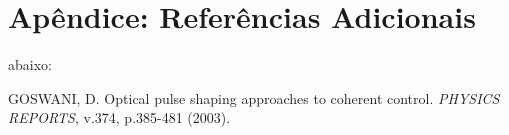 \chapter*{Apêndice: Referências Adicionais}

abaixo:
\begin{thebibliography}{99}

 GOSWANI, D. Optical pulse shaping approaches to coherent control. {\it PHYSICS REPORTS}, v.374, p.385-481 (2003).

\end{thebibliography}



